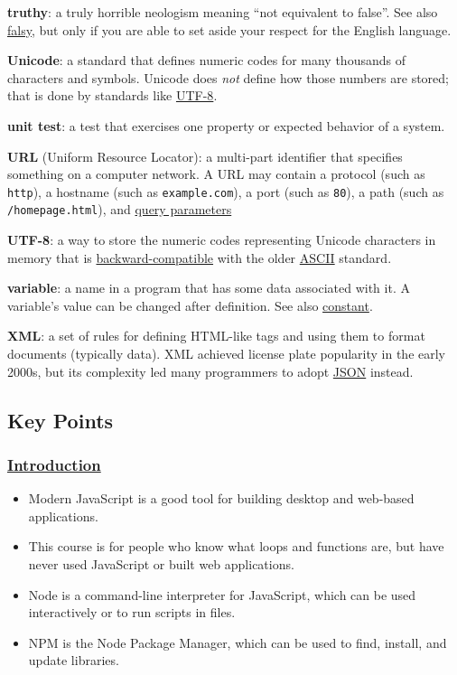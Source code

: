\textbf{truthy}: a truly horrible neologism meaning ``not equivalent to
false''. See also \protect\hyperlink{g:falsy}{falsy}, but only if you
are able to set aside your respect for the English language.

\textbf{Unicode}: a standard that defines numeric codes for many
thousands of characters and symbols. Unicode does \emph{not} define how
those numbers are stored; that is done by standards like
\protect\hyperlink{g:utf-8}{UTF-8}.

\textbf{unit test}: a test that exercises one property or expected
behavior of a system.

\textbf{URL} (Uniform Resource Locator): a multi-part identifier that
specifies something on a computer network. A URL may contain a protocol
(such as \texttt{http}), a hostname (such as \texttt{example.com}), a
port (such as \texttt{80}), a path (such as \texttt{/homepage.html}),
and \protect\hyperlink{g:query-parameter}{query parameters}

\textbf{UTF-8}: a way to store the numeric codes representing Unicode
characters in memory that is
\protect\hyperlink{g:backward-compatible}{backward-compatible} with the
older \protect\hyperlink{g:ascii}{ASCII} standard.

\textbf{variable}: a name in a program that has some data associated
with it. A variable's value can be changed after definition. See also
\protect\hyperlink{g:constant}{constant}.

\textbf{XML}: a set of rules for defining HTML-like tags and using them
to format documents (typically data). XML achieved license plate
popularity in the early 2000s, but its complexity led many programmers
to adopt \protect\hyperlink{g:json}{JSON} instead.

\subsection{Key Points}\label{s:keypoints}

\subsubsection{\texorpdfstring{\protect\hyperlink{s:intro}{Introduction}}{Introduction}}\label{null}

\begin{itemize}
\tightlist
\item
  Modern JavaScript is a good tool for building desktop and web-based
  applications.
\item
  This course is for people who know what loops and functions are, but
  have never used JavaScript or built web applications.
\item
  Node is a command-line interpreter for JavaScript, which can be used
  interactively or to run scripts in files.
\item
  NPM is the Node Package Manager, which can be used to find, install,
  and update libraries.
\end{itemize}


